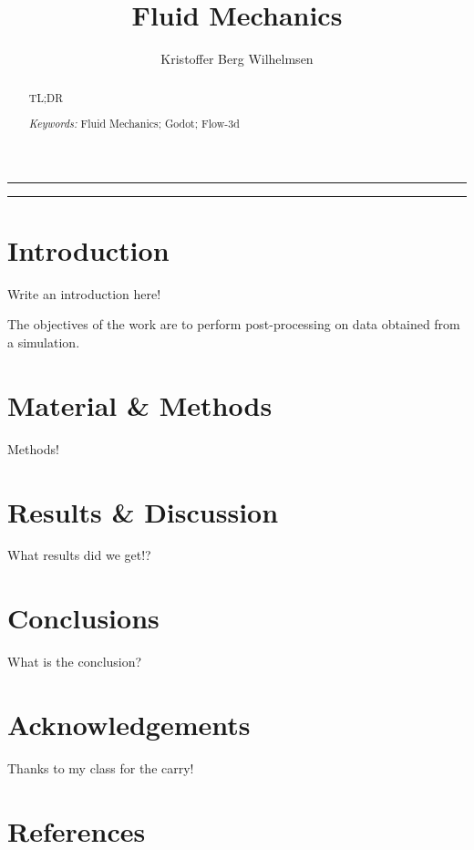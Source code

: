 \documentclass[a4paper,11pt]{extarticle}
\title{Fluid Mechanics}
\author{Kristoffer Berg Wilhelmsen}
\date{\parbox{\linewidth}{\centering
    \textit{\small UiT - The Arctic University of Norway, P.O. Box 385, N-8505 Narvik, Norway}\endgraf\bigskip
    \small Submitted \today
}}
\providecommand{\keywords}[1]{\flushleft\textit{\small{Keywords:}} #1}
\begin{document}
\maketitle

\noindent\rule{\linewidth}{.5pt}
\begin{abstract}
  TL;DR

  \keywords{\small{Fluid Mechanics}; \small{Godot}; \small{Flow-3d}}
\end{abstract}
\rule{\linewidth}{.5pt}


\section{Introduction}
Write an introduction here!

The objectives of the work are to perform post-processing on data obtained from a simulation. 

\lipsum[2-4]

\section{Material \& Methods}
Methods!

\section{Results \& Discussion}
What results did we get!?

\section{Conclusions}
What is the conclusion?

\section{Acknowledgements}
Thanks to my class for the carry!

\section{References}
\begingroup
\def\section*#1{}


\endgroup
\end{document}

